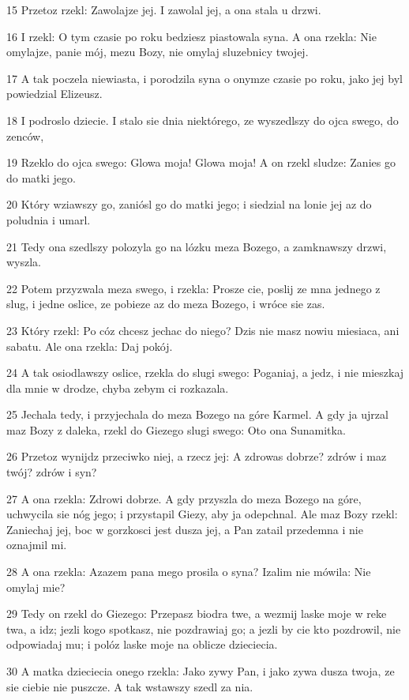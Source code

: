 \par 15 Przetoz rzekl: Zawolajze jej. I zawolal jej, a ona stala u drzwi.
\par 16 I rzekl: O tym czasie po roku bedziesz piastowala syna. A ona rzekla: Nie omylajze, panie mój, mezu Bozy, nie omylaj sluzebnicy twojej.
\par 17 A tak poczela niewiasta, i porodzila syna o onymze czasie po roku, jako jej byl powiedzial Elizeusz.
\par 18 I podroslo dziecie. I stalo sie dnia niektórego, ze wyszedlszy do ojca swego, do zenców,
\par 19 Rzeklo do ojca swego: Glowa moja! Glowa moja! A on rzekl sludze: Zanies go do matki jego.
\par 20 Który wziawszy go, zaniósl go do matki jego; i siedzial na lonie jej az do poludnia i umarl.
\par 21 Tedy ona szedlszy polozyla go na lózku meza Bozego, a zamknawszy drzwi, wyszla.
\par 22 Potem przyzwala meza swego, i rzekla: Prosze cie, poslij ze mna jednego z slug, i jedne oslice, ze pobieze az do meza Bozego, i wróce sie zas.
\par 23 Który rzekl: Po cóz chcesz jechac do niego? Dzis nie masz nowiu miesiaca, ani sabatu. Ale ona rzekla: Daj pokój.
\par 24 A tak osiodlawszy oslice, rzekla do slugi swego: Poganiaj, a jedz, i nie mieszkaj dla mnie w drodze, chyba zebym ci rozkazala.
\par 25 Jechala tedy, i przyjechala do meza Bozego na góre Karmel. A gdy ja ujrzal maz Bozy z daleka, rzekl do Giezego slugi swego: Oto ona Sunamitka.
\par 26 Przetoz wynijdz przeciwko niej, a rzecz jej: A zdrowas dobrze? zdrów i maz twój? zdrów i syn?
\par 27 A ona rzekla: Zdrowi dobrze. A gdy przyszla do meza Bozego na góre, uchwycila sie nóg jego; i przystapil Giezy, aby ja odepchnal. Ale maz Bozy rzekl: Zaniechaj jej, boc w gorzkosci jest dusza jej, a Pan zatail przedemna i nie oznajmil mi.
\par 28 A ona rzekla: Azazem pana mego prosila o syna? Izalim nie mówila: Nie omylaj mie?
\par 29 Tedy on rzekl do Giezego: Przepasz biodra twe, a wezmij laske moje w reke twa, a idz; jezli kogo spotkasz, nie pozdrawiaj go; a jezli by cie kto pozdrowil, nie odpowiadaj mu; i polóz laske moje na oblicze dzieciecia.
\par 30 A matka dzieciecia onego rzekla: Jako zywy Pan, i jako zywa dusza twoja, ze sie ciebie nie puszcze. A tak wstawszy szedl za nia.

